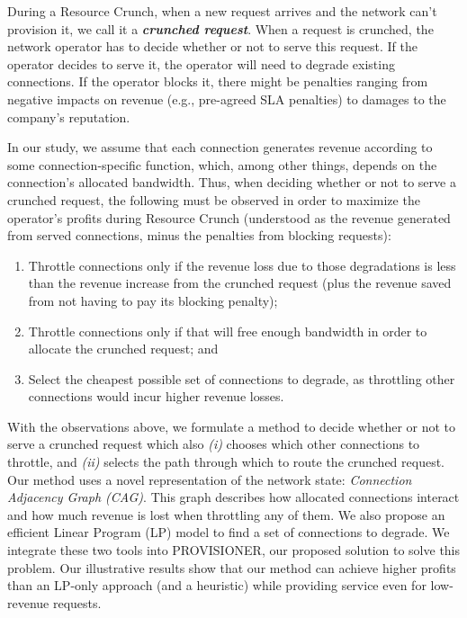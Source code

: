 \documentclass[journal]{IEEEtran}
\begin{document}
During a Resource Crunch, when a new request arrives and the network can't provision it, we call it a \textbf{\textit{crunched request}}. When a request is crunched, the network operator has to decide whether or not to serve this request. If the operator decides to serve it, the operator will need to degrade existing connections. If the operator blocks it, there might be penalties ranging from negative impacts on revenue (e.g., pre-agreed SLA penalties) to damages to the company's reputation.

In our study, we assume that each connection generates revenue according to some connection-specific function, which, among other things, depends on the connection's allocated bandwidth. Thus, when deciding whether or not to serve a crunched request, the following must be observed in order to maximize the operator’s profits during Resource Crunch (understood as the revenue generated from served connections, minus the penalties from blocking requests):
\begin{enumerate}
 \item Throttle connections only if the revenue loss due to those degradations is less than the revenue increase from the crunched request (plus the revenue saved from not having to pay its blocking penalty); 
 \item Throttle connections only if that will free enough bandwidth in order to allocate the crunched request; and 
 \item Select the cheapest possible set of connections to degrade, as throttling other connections would incur higher revenue losses. 
\end{enumerate}

With the observations above, we formulate a method to decide whether or not to serve a crunched request which also \textit{(i)} chooses which other connections to throttle, and \textit{(ii)} selects the path through which to route the crunched request. Our method uses a novel representation of the network state: \textit{Connection Adjacency Graph (CAG)}. This graph describes how allocated connections interact and how much revenue is lost when throttling any of them. We also propose an efficient Linear Program (LP) model to find a set of connections to degrade. We integrate these two tools into PROVISIONER, our proposed solution to solve this problem. Our illustrative results show that our method can achieve higher profits than an LP-only approach (and a heuristic) while providing service even for low-revenue requests.
\end{document}
